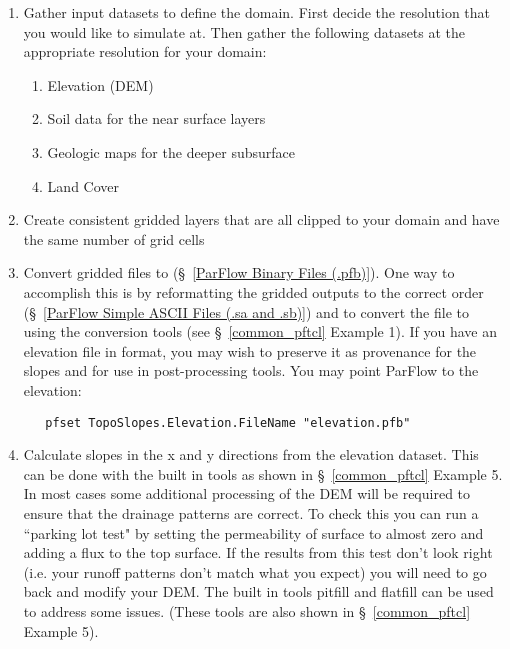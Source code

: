 \begin{enumerate}
   \item Gather input datasets to define the domain. First decide the resolution that you 
   would like to simulate at. Then gather the following datasets at the appropriate resolution 
   for your domain:
   \begin{enumerate}
		\item Elevation (DEM)
	    \item Soil data for the near surface layers 
	    \item Geologic maps for the deeper subsurface
	    \item Land Cover
	\end{enumerate}
	
   \item Create consistent gridded layers that are all clipped to your domain and have 
  the same number of grid cells

   \item Convert gridded files to  (\S~\ref{ParFlow Binary Files (.pfb)}). One way 
   to accomplish this is by reformatting the gridded outputs to the correct \parflow{}
    order (\S~\ref{ParFlow Simple ASCII Files (.sa and .sb)}) and to convert
   the  file to  using the conversion tools (see \S~\ref{common_pftcl}
   Example 1). If you have an elevation file in  format, you may wish to preserve
   it as provenance for the slopes and for use in post-processing tools. You may point
   ParFlow to the elevation:
   \begin{display}\begin{verbatim}
   pfset TopoSlopes.Elevation.FileName "elevation.pfb"
   \end{verbatim}\end{display}
  
   \item Calculate slopes in the x and y directions from the elevation dataset. This can be 
   done with the built in tools as shown in \S~\ref{common_pftcl} Example 5. 
   In most cases some additional processing of  the DEM will be required to ensure that 
   the drainage patterns are correct. To check this  you  can run a ``parking lot test" by 
   setting the permeability of surface to almost zero and adding a flux to the top surface.
   If the results from this test don't look right (i.e. your runoff patterns don't match 
   what you expect) you will need to go back and modify your DEM.  The built in \parflow{}
   tools pitfill and flatfill can be used to address some issues. 
   (These tools are also shown in \S~\ref{common_pftcl} Example 5). 


\end{enumerate}
